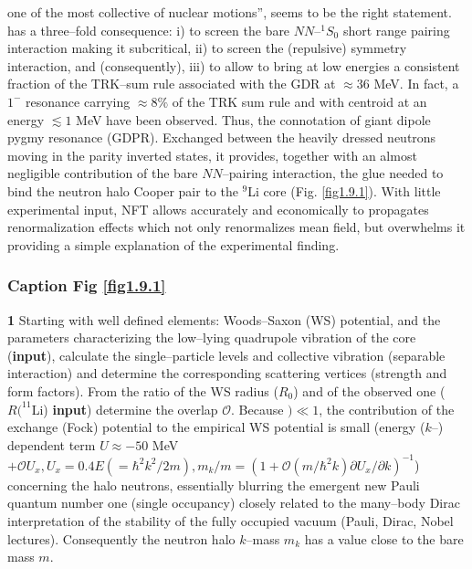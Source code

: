 { one of the most collective of nuclear  motions'', seems to be  the right statement.} has a three--fold consequence: i) to screen the bare $NN$--$^1S_0$ short  range pairing interaction making it subcritical, ii) to screen the (repulsive) symmetry interaction, and (consequently), iii) to allow to bring at low energies a consistent fraction of the TRK--sum rule associated with the GDR at $\approx 36$ MeV. In fact, a $1^-$ resonance carrying $\approx 8\%$ of the TRK sum rule and with centroid at an energy $\lesssim 1$ MeV have been observed. Thus, the connotation of giant dipole pygmy resonance (GDPR). Exchanged between the heavily dressed neutrons moving in the parity inverted states, it provides, together with an almost negligible contribution of the bare $NN$--pairing interaction, the glue needed to bind the neutron halo Cooper pair to the $^9$Li core (Fig. \ref{fig1.9.1}). With little experimental input, NFT allows accurately and economically to propagates renormalization effects which not only renormalizes mean field, but overwhelms it providing a simple explanation of the experimental finding.
\subsubsection{Caption Fig \ref{fig1.9.1}}

\textbf{1} Starting with well defined elements: Woods--Saxon (WS) potential, and the parameters characterizing the low--lying quadrupole vibration of the core (\textbf{input}), calculate the single--particle levels and collective vibration (separable interaction) and determine the corresponding scattering vertices (strength and form factors). From the ratio of the WS radius ($R_0$) and of the observed one ($R(^{11}$Li) \textbf{input}) determine the overlap $\mathscr O$. Because $\mathscr )\ll 1$, the contribution of the exchange (Fock) potential to the empirical WS potential is small (energy ($k$--) dependent term $U\approx -50 $ MeV $+\mathscr O U_x, U_x= 0.4 E (=\hbar^2k^2/2m), m_k/m=(1+\mathscr O(m/\hbar^2k)\partial U_x/\partial k)^{-1}$)  concerning the halo neutrons, essentially blurring the emergent new Pauli quantum number one (single occupancy) closely related to the many--body Dirac interpretation of the stability of the fully occupied vacuum (Pauli, Dirac, Nobel lectures). Consequently the neutron halo $k$--mass $m_k$ has a value close to the bare mass $m$.

